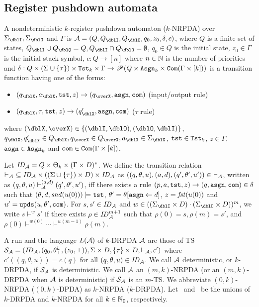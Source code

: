 \subsection{Register pushdown automata}\label{sec:RA}
\begin{definition}
A nondeterministic $k$-register pushdown automaton ($k$-NRPDA) over $\Sigma_\dblI,\Sigma_\dblO$ and $\Gamma$ is $\calA=(Q, Q_\dblI, Q_\dblO, q_0, z_0, \delta, c)$, where
$Q$ is a finite set of states,
$Q_\dblI\cup Q_\dblO = Q, Q_\dblI\cap Q_\dblO = \emptyset$,
$q_0\in Q$ is the initial state,
$z_0\in \Gamma$ is the initial stack symbol,
$c: Q \to [n]$ where $n\in \mathbb{N}$ is the number of priorities
and
$\delta: Q \times (\Sigma\cup\{\tau\})\times \mathtt{Tst}_k\times\Gamma \to \mathscr{P}(Q \times\mathtt{Asgn}_k\times \mathtt{Com}(\Gamma\times[k]))$ is a transition function having one of the forms:
\begin{itemize}
\item $(q_\dblX,a_\dblX,\tst,z)\to(q_\overX,\asgn,\com)$ (input/output rule)
\item $(q_\dblX,\tau,\tst,z)\to(q'_\dblX,\asgn,\com)$ ($\tau$ rule)
\end{itemize}
where $(\dblX, \overX)\in\{(\dblI, \dblO), (\dblO,\dblI)\}$,
$q_\dblX, q'_\dblX\in Q_\dblX, q_\overX\in Q_\overX, a_\dblX\in \Sigma_\dblX$, $\mathtt{tst}\in\mathtt{Tst}_k$, $z\in\Gamma$, $\mathtt{asgn}\in\mathtt{Asgn}_k$ and $\mathtt{com}\in\mathtt{Com}(\Gamma\times[k])$.
\end{definition}
\noindent
Let $\mathit{ID}_{\cal A}= Q\times \Theta_k\times (\Gamma\times D)^*$.
We define the transition relation $\vdash_{\cal A}\ \subseteq\mathit{ID}_{\cal A}\times ((\Sigma\cup\{\tau\})\times D)\times \mathit{ID}_{\cal A}$ as
$((q,\theta,u), (a,d), (q',\theta',u'))\in\ \vdash_\calA$,
written as $(q,\theta,u)\vdash^{(a,d)}_{{\cal A}}(q',\theta',u')$, iff
there exists a rule $(p, a, \mathtt{tst}, z) \to (q, \mathtt{asgn}, \mathtt{com}) \in \delta$
such that
$(\theta, d, \mathit{snd}(u(0)))\models\mathtt{tst}$, $\theta' = \theta[\mathtt{asgn}\leftarrow d]$,
$z=\mathit{fst}(u(0))$ and
$u'= \mathtt{upds}(u,\theta',\mathtt{com})$.
For $s,s'\in\mathit{ID}_{\cal A}$ and
$w\in((\Sigma_\dblI\times D)\cdot (\Sigma_\dblO\times D))^{m}$,
we write $s\vdash^{w}s'$ if
there exists $\rho\in\mathit{ID}_{\cal A}^{m+1}$ such that
$\rho(0)=s, \rho(m)=s'$, and
$\rho(0)\vdash^{w(0)}\cdots\vdash^{w(m-1)}\rho(m)$.

A run and the language $L({\cal A})$ of $k$-DRPDA ${\cal A}$ are those of TS
${\cal S}_{\cal A}=(\mathit{ID}_{\cal A}, (q_0, \theta^k_\bot, (z_0,\bot)), \Sigma\times D, \{\tau\}\times D, \vdash_{\cal A}, c')$ where
$c'((q,\theta,u))=c(q)$ for all $(q,\theta,u)\in\mathit{ID}_{\cal A}$.
We call ${\cal A}$ deterministic, or $k$-DRPDA, if ${\cal S}_{\cal A}$ is deterministic.
We call ${\cal A}$ an $(m,k)$-NRPDA (or an $(m,k)$-DRPDA when ${\cal A}$ is deterministic)
if ${\cal S}_{\cal A}$ is an $m$-TS.
We abbreviate $(0,k)$-NRPDA ($(0,k)$-DPDA) as $k$-NRPDA ($k$-DRPDA).
Let \DRPDA\ and \NRPDA\ be the unions of $k$-DRPDA and $k$-NRPDA for all $k\in\mathbb{N}_0$, respectively.

